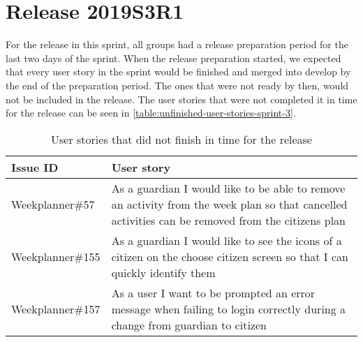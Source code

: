 \section{Release 2019S3R1} \label{sec:sprint-3-release}
For the release in this sprint, all groups had a release preparation period for the last two days of the sprint. 
When the release preparation started, we expected that every user story in the sprint would be finished and merged into develop by the end of the preparation period. 
The ones that were not ready by then, would not be included in the release.
The user stories that were not completed it in time for the release can be seen in \autoref{table:unfinished-user-stories-sprint-3}.

\begin{table}[H]
    \small
    \begin{tabular}{|p{3.5cm}|p{9cm}|}
    \hline
    Issue ID        & User story   \\ \hline
    Weekplanner\#57  & As a guardian I would like to be able to remove an activity from the week plan so that cancelled activities can be removed from the citizens plan \\ \hline
    Weekplanner\#155 & As a guardian I would like to see the icons of a citizen on the choose citizen screen so that I can quickly identify them \\ \hline
    Weekplanner\#157 & As a user I want to be prompted an error message when failing to login correctly during a change from guardian to citizen \\ \hline
    \end{tabular}
    \caption{User stories that did not finish in time for the release}\label{table:unfinished-user-stories-sprint-3}
\end{table}


